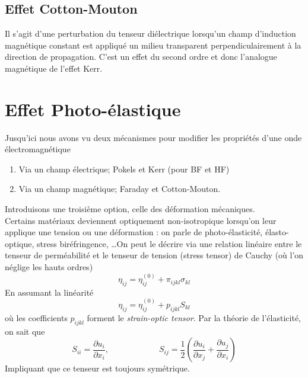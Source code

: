 \subsection{Effet Cotton-Mouton}
Il s'agit d'une perturbation du tenseur diélectrique lorsqu'un champ d'induction magnétique constant est 
appliqué un milieu transparent perpendiculairement à la direction de propagation. C'est un effet du second
ordre et donc l'analogue magnétique de l'effet Kerr. 


\section{Effet Photo-élastique}
Jusqu'ici nous avons vu deux mécanismes pour modifier les propriétés d'une onde électromagnétique
\begin{enumerate} 
\item Via un champ électrique; Pokels et Kerr (pour BF et HF)
\item Via un champ magnétique; Faraday et Cotton-Mouton.
\end{enumerate}
Introduisons une troisième option, celle des déformation mécaniques.\\

Certains matériaux deviennent optiquement non-isotropique lorsqu'on leur applique une tension ou une 
déformation : on parle de photo-élasticité, élasto-optique, stress biréfringence, \dots On peut le décrire
via une relation linéaire entre le tenseur de perméabilité et le tenseur de tension (stress tensor) de 
Cauchy (où l'on néglige les hauts ordres)
\begin{equation}
\eta_{ij} = \eta_{ij}^{(0)}+\pi_{ijkl}\sigma_{kl}
\end{equation}
En assumant la linéarité
\begin{equation}
\eta_{ij} = \eta_{ij}^{(0)}+p_{ijkl}S_{kl}
\end{equation}
où les coefficients $p_{ijkl}$ forment le \textit{strain-optic tensor}. Par la théorie de l'élasticité, on sait
que
\begin{equation}
S_{ii} = \dfrac{\partial u_i}{\partial x_i},\qquad\qquad\qquad
S_{ij} = \dfrac{1}{2}\left(\dfrac{\partial u_i}{\partial x_j}+\dfrac{\partial u_j}{\partial x_i}\right)
\end{equation}
Impliquant que ce tenseur est toujours symétrique.\\

